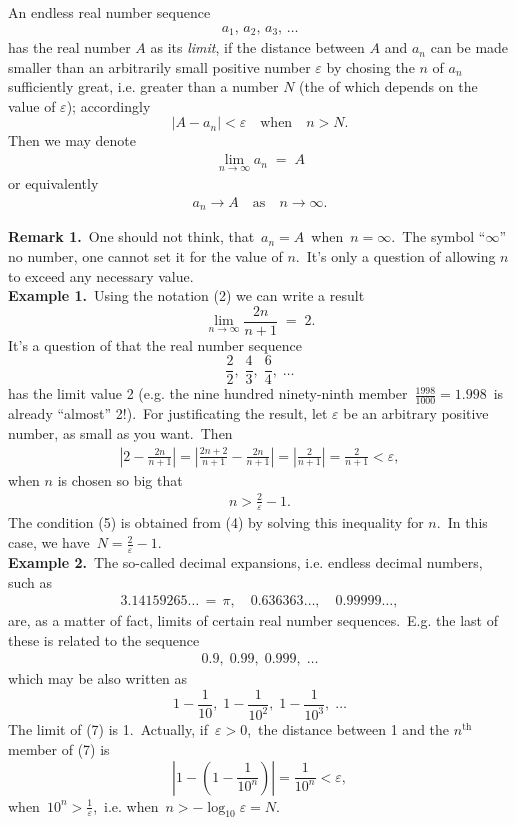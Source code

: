 \documentclass[12pt]{article}
\theoremstyle{definition}
\begin{document}
An endless real number sequence
\begin{align}
a_1,\,a_2,\,a_3,\,\ldots
\end{align}
has the real number $A$ as its {\em limit}, if the distance 
between $A$ and $a_n$ can be made smaller than an arbitrarily 
small positive number $\varepsilon$ by chosing the 
 $n$ of $a_n$ sufficiently great, i.e. greater than a number $N$ (the  of which depends on the value of $\varepsilon$); accordingly
$$|A-a_n| < \varepsilon \quad \mbox{when} \quad n > N.$$
Then we may denote
\begin{align}
\lim_{n\to\infty}a_n \;=\; A
\end{align}
or equivalently
\begin{align}
a_n \to A \quad \mbox{as} \quad n \to \infty.
\end{align}

\textbf{Remark 1.}\, One should not think, that\, $a_n = A$\, when\, $n = \infty$.\, The symbol ``$\infty$''  no number, one cannot set it for the value of $n$.\, It's only a question of allowing $n$ to exceed any necessary 
value.\\

\textbf{Example 1.}\, Using the notation (2) we can write a result
             $$\lim_{n\to\infty}\frac{2n}{n\!+\!1} \;=\; 2.$$
It's a question of that the real number sequence
     $$\frac{2}{2},\;\frac{4}{3},\;\frac{6}{4},\;\ldots$$
has the limit value 2 (e.g. the nine hundred ninety-ninth member\, $\frac{1998}{1000} = 1.998$\, is already ``almost'' 2!).\, For justificating the result, let $\varepsilon$ be an arbitrary positive number, as small as you want.\, Then
\begin{align}
\left|2-\frac{2n}{n\!+\!1}\right| = \left|\frac{2n\!+\!2}{n\!+\!1}-\frac{2n}{n\!+\!1}\right| 
= \left|\frac{2}{n\!+\!1}\right| = \frac{2}{n\!+\!1} < \varepsilon,
\end{align}
when $n$ is chosen so big that
\begin{align}
n > \frac{2}{\varepsilon}\!-\!1.
\end{align}
The condition (5) is obtained from (4) by solving this inequality for $n$.\, In this case, we have\, 
$N = \frac{2}{\varepsilon}\!-\!1$.\\

\textbf{Example 2.}\, The so-called decimal expansions, i.e. endless decimal numbers, such as
\begin{align}
3.14159265\ldots \,=\, \pi, \quad 0.636363\ldots, \quad 0.99999\ldots,
\end{align}
are, as a matter of fact, limits of certain real number sequences.\, E.g. the last of these is related to the sequence
\begin{align}
0.9,\;0.99,\;0.999,\;\ldots
\end{align}
which may be also written as
$$1\!-\!\frac{1}{10},\; 1\!-\!\frac{1}{10^2},\; 1\!-\!\frac{1}{10^3},\;\ldots $$
The limit of (7) is 1.\, Actually, if\, $\varepsilon > 0$,\, the distance between 1 and the $n^\mathrm{th}$ member of (7) is
$$\left|1-\left(1\!-\!\frac{1}{10^n}\right)\right| = \frac{1}{10^n} < \varepsilon,$$
when\, $10^n > \frac{1}{\varepsilon}$,\, i.e. when\, $n > -\log_{10}\varepsilon = N$.
\end{document}
